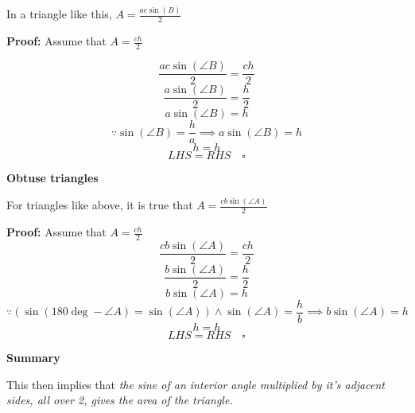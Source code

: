 \documentclass[a4paper, 12pt]{article}
\begin{document}
In a triangle like this,  {\Large $A = \frac{ac\sin(B)}{2}$} \bigbreak 
\begin{center}

	\textbf{Proof:}\bigbreak
Assume that $A = \frac{ch}{2}$
\end{center}

$$\frac{ac\sin(\angle{B})}{2} = \frac{ch}{2}$$ 
$$\frac{a\sin(\angle{B})}{2} = \frac{h}{2}$$ 
$$a\sin(\angle{B}) = h$$ 
$$\because \sin(\angle{B}) = \frac{h}{a} \implies a\sin(\angle{B}) = h$$
$$h = h$$
$$LHS = RHS \quad \square$$

\newpage



\begin{center}
	{\large \textbf{Obtuse triangles} } \bigbreak


\end{center}
For triangles like above, it is true that {\Large $A = \frac{cb\sin(\angle{A})}{2}$}

\begin{center}
	\textbf{Proof:}
	Assume that $A = \frac{ch}{2}$ \\
	$$\frac{cb\sin(\angle{A})}{2} = \frac{ch}{2}$$
	$$\frac{b\sin(\angle{A})}{2} = \frac{h}{2}$$
	$$b\sin(\angle{A}) = h$$
	$$\because (\sin(180\deg - \angle{A}) = \sin(\angle{A})) \land \sin(\angle{A}) = \frac{h}{b} \implies b\sin(\angle{A}) = h$$
	$$h = h$$
	$$LHS = RHS \quad \square$$
\end{center}
\newpage



{\large \textbf{Summary}} \bigbreak

This then implies that \emph{the sine of an interior angle multiplied by it's adjacent sides, all over 2, gives the area of the triangle.}
\end{document}
